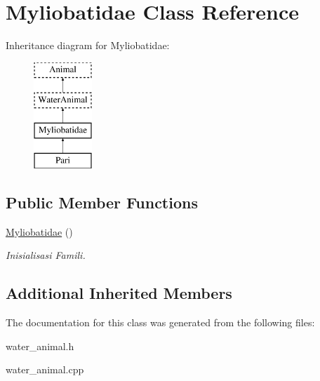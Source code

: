 \hypertarget{class_myliobatidae}{}\section{Myliobatidae Class Reference}
\label{class_myliobatidae}
Inheritance diagram for Myliobatidae\+:\begin{figure}[H]
\begin{center}
\leavevmode
\includegraphics[height=4.000000cm]{class_myliobatidae}
\end{center}
\end{figure}
\subsection*{Public Member Functions}
\begin{DoxyCompactItemize}
\item 
\hyperlink{class_myliobatidae_a4b956aa8ef9e6de9519f9a81a91e0ac9}{Myliobatidae} ()\hypertarget{class_myliobatidae_a4b956aa8ef9e6de9519f9a81a91e0ac9}{}\label{class_myliobatidae_a4b956aa8ef9e6de9519f9a81a91e0ac9}

\begin{DoxyCompactList}\small\item\em Inisialisasi Famili. \end{DoxyCompactList}\end{DoxyCompactItemize}
\subsection*{Additional Inherited Members}


The documentation for this class was generated from the following files\+:\begin{DoxyCompactItemize}
\item 
water\+\_\+animal.\+h\item 
water\+\_\+animal.\+cpp\end{DoxyCompactItemize}
